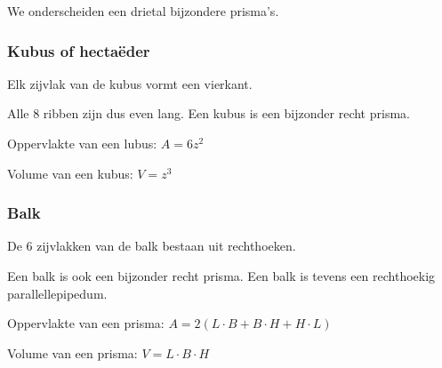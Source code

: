 We onderscheiden een drietal bijzondere prisma's.

\subsubsection{Kubus of hecta\"eder}
\begin{definitie}
	Elk zijvlak van de kubus vormt een vierkant.
\end{definitie}

Alle 8 ribben zijn dus even lang. Een kubus is een bijzonder recht prisma.



		
\begin{ftonthoud}
		Oppervlakte van een lubus: $A=6z^2$
		
		Volume van een kubus: $V=z^3$
\end{ftonthoud}
		

\subsubsection{Balk}
\begin{definitie}
	De 6 zijvlakken van de balk bestaan uit rechthoeken. 
\end{definitie}

Een balk is ook een bijzonder recht prisma.
Een balk is tevens een rechthoekig parallellepipedum.




\begin{ftonthoud}
			
		Oppervlakte van een prisma: $A=2(L\cdot B+B\cdot H+H\cdot L)$
		
		Volume van een prisma: $V=L\cdot B\cdot H$

\end{ftonthoud}


